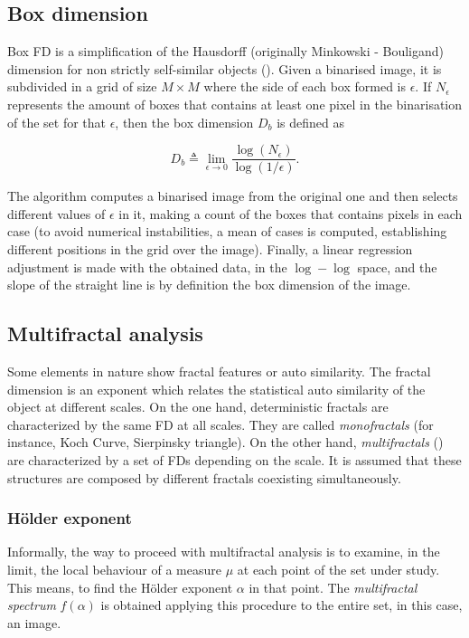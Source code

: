 \subsection{Box dimension}
\label{sec:3}
Box FD is a simplification of the Hausdorff (originally Minkowski - Bouligand) dimension for non strictly self-similar objects (\cite{Peitgen2004}). Given a binarised image, it is subdivided in a grid of size $M\times M$ where the side of each box formed is $\epsilon$. If $N_{\epsilon}$ represents the amount of boxes that contains at least one pixel in the binarisation of the set for that $\epsilon$, then the box dimension  $D_{b}$ is defined as

\begin{equation}
D_{b} \triangleq \displaystyle\lim_{\epsilon \to 0}{\frac{\log(N_{\epsilon})}{\log (1/\epsilon)}}.
\label{eqn:1}
\end{equation}

The algorithm computes a binarised image from the original one and then selects different values of $\epsilon$ in it, making a count of the boxes that contains pixels in each case (to avoid numerical instabilities, a mean of cases is computed, establishing different positions in the grid over the image). Finally, a linear regression adjustment is made with the obtained data, in the $\log-\log$ space, and the slope of the straight line is by definition the box dimension of the image. %


\subsection{Multifractal analysis}
\label{sec:4}
Some elements in nature show fractal features or auto similarity. The fractal dimension is an exponent which relates the statistical auto similarity of the object at different scales. On the one hand, deterministic fractals are characterized by the same FD at all scales. They are called {\em monofractals} (for instance, Koch Curve, Sierpinsky triangle). On the other hand, {\em multifractals} (\cite{Mandelbrot89}) are characterized by a set of FDs depending on the scale. It is assumed that these structures are composed by different fractals coexisting simultaneously.

\subsubsection{H\"older exponent}
\label{sec:5}
Informally, the way to proceed with multifractal analysis is to examine, in the limit, the local behaviour of a measure $\mu$ at each point of the set under study. This means, to find the H\"older exponent $\alpha$ in that point. The {\em multifractal spectrum} $f(\alpha)$ is obtained applying this procedure to the entire set, in this case, an image.

